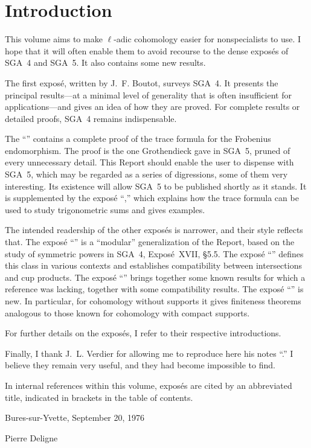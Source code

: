 
\chapter*{Introduction}

This volume aims to make $\ell$-adic cohomology easier for nonspecialists to
use. I hope that it will often enable them to avoid recourse to the dense
expos\'es of SGA~4 and SGA~5. It also contains some new results.

The first expos\'e, written by J.~F. Boutot, surveys SGA~4. It presents the
principal results---at a minimal level of generality that is often
insufficient for applications---and gives an idea of how they are proved. For
complete results or detailed proofs, SGA~4 remains indispensable.

The ``'' contains a complete proof of the trace formula for the
Frobenius endomorphism. The proof is the one Grothendieck gave in SGA~5,
pruned of every unnecessary detail. This Report should enable the user to
dispense with SGA~5, which may be regarded as a series of digressions, some of
them very interesting. Its existence will allow SGA~5 to be published shortly
as it stands. It is supplemented by the expos\'e ``,'' which
explains how the trace formula can be used to study trigonometric sums and
gives examples.

The intended readership of the other expos\'es is narrower, and their style
reflects that. The expos\'e ``'' is a ``modular'' generalization
of the Report, based on the study of symmetric powers in SGA~4, Expos\'e~XVII,
\S5.5. The expos\'e ``'' defines this class in various contexts
and establishes compatibility between intersections and cup products. The
expos\'e ``'' brings together some known results for which a
reference was lacking, together with some compatibility results. The expos\'e
``'' is new. In particular, for cohomology without supports it
gives finiteness theorems analogous to those known for cohomology with compact
supports.

For further details on the expos\'es, I refer to their respective
introductions.

Finally, I thank J.~L. Verdier for allowing me to reproduce here his notes
``.'' I believe they remain very useful, and they had become
impossible to find.

In internal references within this volume, expos\'es are cited by an
abbreviated title, indicated in brackets in the table of contents.

\vspace{20pt}
Bures-sur-Yvette, September 20, 1976

\vspace{5pt}
Pierre Deligne

